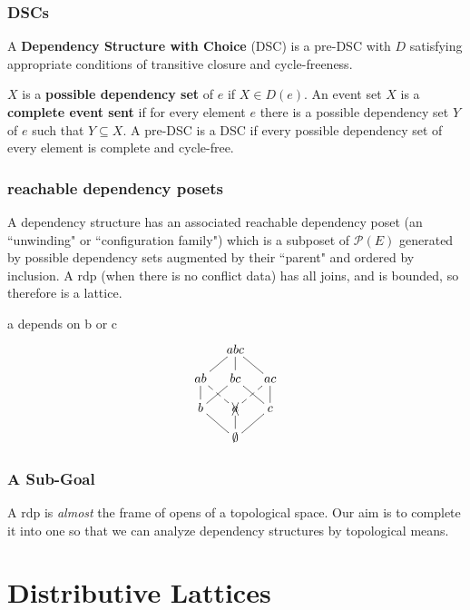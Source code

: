 \documentclass{beamer}
\newcommand{\Pc}{\mathcal{P}}
\begin{document}
\begin{frame}
\frametitle{DSCs}
\begin{definition}
A \textbf{Dependency Structure with Choice} (DSC) is a pre-DSC with \(D\) satisfying appropriate conditions of transitive closure and cycle-freeness.
\end{definition}
\(X\) is a \textbf{possible dependency set} of \(e\) if \(X \in D(e)\). An event set \(X\) is a \textbf{complete event sent} if for every element \(e\) there is a possible dependency set \(Y\) of \(e\) such that \(Y \subseteq X\). A pre-DSC is a DSC if every possible dependency set of every element is complete and cycle-free.
\end{frame}

\begin{frame}
\frametitle{reachable dependency posets}
A dependency structure has an associated reachable dependency poset (an ``unwinding" or ``configuration family") which is a subposet of \(\Pc(E)\) generated by possible dependency sets augmented by their ``parent" and ordered by inclusion. A rdp (when there is no conflict data) has all joins, and is bounded, so therefore is a lattice.
\begin{block}{a depends on b or c}
\begin{equation*}
    \xymatrix@=1em{& abc \ar@{-}[dl] \ar@{-}[d] \ar@{-}[dr] & \\
      ab \ar@{-}[d] \ar@{--}[dr] & bc \ar@{-}[dl] \ar@{-}[dr] &
        ac \ar@{-}[d] \ar@{--}[dl] \\
      b \ar@{-}[dr] & \xcancel{a} \ar@{--}[d] & c \ar@{-}[dl] \\
       & \emptyset &}
\end{equation*}
\end{block}
\end{frame}

\begin{frame}
\frametitle{A Sub-Goal}
A rdp is \textit{almost} the frame of opens of a topological space. Our aim is to complete it into one so that we can analyze dependency structures by topological means.
\end{frame}

\section{Distributive Lattices}
\end{document}
